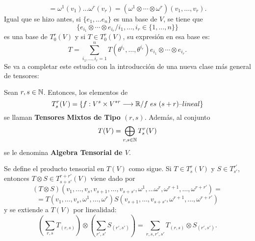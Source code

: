 \documentclass[cursovd_portada.tex]{subfiles}
\begin{document}
$$=\omega^1(v_1)\dots\omega^r(v_r)=(\omega^1\otimes\cdots\otimes\omega^r)(v_1,
\dots ,v_r).$$ \hs Igual que se hizo antes, si $\{e_1, \dots e_n\}$ es una base de $V$, se tiene que
$$\{e_{i_1}\otimes\cdots\otimes e_{i_r}/i_1,\dots ,i_r\in\{1,\dots ,n\}\}$$
es una base de $T^r_0(V)$ y si $T\in T^r_0(V)$, su expresión en esa base es:
$$T=\sum_{i_1,\dots,i_r=1}^{n}T(\theta^{i_1},\dots ,\theta^{i_r})e_{i_1}
\otimes\cdots\otimes e_{i_r}.$$ \hs Se va a completar este estudio con la introducción de una nueva clase más
general de tensores:
\begin{defiap}
Sean $r,s\in\mathbb{N}$. Entonces, los elementos de
$$T^r_s(V)=\{f:V^s\times V^{*r}\longrightarrow\mathbb{R} /f\mbox{ }es\mbox{ }(s+r)\mbox{--}lineal
\}$$ se llaman {\bf Tensores Mixtos de Tipo $(r,s)$}. Además, al conjunto
$$T(V)=\bigoplus_{r,s\in\mathbb{N}}T^r_s(V)$$
se le denomina {\bf Algebra Tensorial de $V$}.
\end{defiap}
\par\bigskip
Se define el producto tensorial en $T(V)$ como sigue. Si $T\in T^r_s(V)$ y $S \in T^{r'}_{s'}$, entonces $T\otimes
S\in T^{r+r'}_{s+s'}(V)$ viene dado por
$$(T\otimes S)(v_1,\dots, v_s,v_{s+1},\dots ,v_{s+s'},\omega^1,\dots\omega^r,
\omega^{r+1},\dots ,\omega^{r+r'})=$$
$$=T(v_1,\dots ,v_s,\omega^1,\dots ,\omega^r)S(v_{s+1},\dots, v_{s+s'},\omega^
{r+1},\dots ,\omega^{r+r'})$$ y se extiende a $T(V)$ por linealidad:
$$\left(\sum_{r,s}T_{(r,s)}\right)\otimes\left(\sum_{r',s'}S_{(r',s')}\right)=\sum_{r,s,r',s'}T_{(
r,s)}\otimes S_{(r',s')}.$$

\newpage
\end{document}
